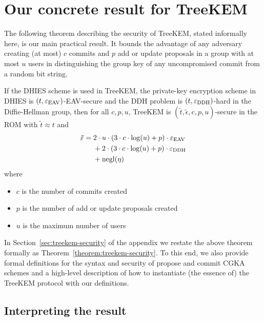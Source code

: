\section{Our concrete result for TreeKEM}

The following theorem describing the security of TreeKEM, stated informally here, is our main practical result. It bounds the advantage of any adversary creating (at most) $c$ commits and $p$ add or update proposals in a group with at most $u$ users in distinguishing the group key of any uncompromised commit from a random bit string.

\begin{theorem}[Informal] \label{theorem:treekem-security-informal}
	If the DHIES scheme is used in TreeKEM, the private-key encryption scheme in DHIES is $(t, \varepsilon_\mathrm{EAV})$-EAV-secure and the DDH problem is $(t, \varepsilon_\mathrm{DDH})$-hard in the Diffie-Hellman group, then for all $c, p, u$, TreeKEM is $(\tilde{t}, \tilde{\epsilon}, c, p, u)$-secure in the ROM with $\tilde{t} \approx t$ and
	\begin{align*}
		\begin{split}
			\tilde{\varepsilon} ={} & 2 \cdot u \cdot (3 \cdot c \cdot \log(u) + p) \cdot \varepsilon_\mathrm{EAV} \\
			& + 2 \cdot (3 \cdot c \cdot \log(u) + p) \cdot \varepsilon_\mathrm{DDH} \\
			& + \mathrm{negl}(\eta)
		\end{split}
	\end{align*}
	where
	\begin{itemize}
		\item $c$ is the number of commits created
		\item $p$ is the number of add or update proposals created
		\item $u$ is the maximum number of users
	\end{itemize}
\end{theorem}

In Section~\ref{sec:treekem-security} of the appendix we restate the above theorem formally as Theorem~\ref{theorem:treekem-security}. To this end, we also provide formal definitions for the syntax and security of propose and commit CGKA schemes and a high-level description of how to instantiate (the essence of) the TreeKEM protocol with our definitions.

\subsection{Interpreting the result}

